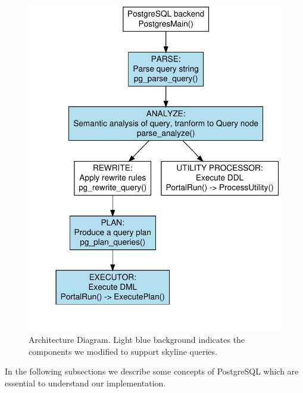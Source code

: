\begin{figure}[htbp]
\centering
\includegraphics[scale=0.75]{plots-qp/pgsql-arch}
\caption{Architecture Diagram. Light blue background indicates the components we modified to support skyline queries.}%
\label{fig:pgsql-arch}%
\end{figure}

In the following subsections we describe some concepts of PostgreSQL
which are essential to understand our implementation.

